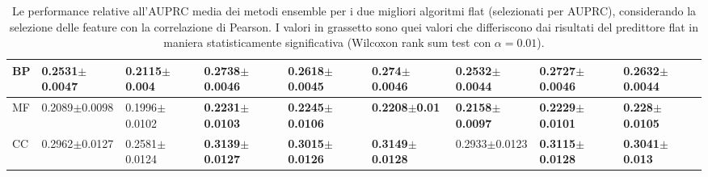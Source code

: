 \documentclass[12pt]{report}
\begin{document}
\begin{table}[h!]
{\begin{subtable}[t]{0.4\textwidth}
\begin{tabular}{|l|l|l|l|l|l|l|l|l|}
BP&\footnotesize{0.2531$\pm$0.0047}&\footnotesize{0.2115$\pm$0.004}& \textbf{\footnotesize{0.2738$\pm$0.0046}} & \textbf{\footnotesize{0.2618$\pm$0.0045}} & \textbf{\footnotesize{0.274$\pm$0.0046}} &\footnotesize{0.2532$\pm$0.0044}& \textbf{\footnotesize{0.2727$\pm$0.0046}} & \textbf{\footnotesize{0.2632$\pm$0.0044}} \\ \hline
MF&\footnotesize{0.2089$\pm$0.0098}&\footnotesize{0.1996$\pm$0.0102}& \textbf{\footnotesize{0.2231$\pm$0.0103}} & \textbf{\footnotesize{0.2245$\pm$0.0106}} & \textbf{\footnotesize{0.2208$\pm$0.01}} & \textbf{\footnotesize{0.2158$\pm$0.0097}} & \textbf{\footnotesize{0.2229$\pm$0.0101}} & \textbf{\footnotesize{0.228$\pm$0.0105}} \\ \hline
CC&\footnotesize{0.2962$\pm$0.0127}&\footnotesize{0.2581$\pm$0.0124}& \textbf{\footnotesize{0.3139$\pm$0.0127}} & \textbf{\footnotesize{0.3015$\pm$0.0126}} & \textbf{\footnotesize{0.3149$\pm$0.0128}} &\footnotesize{0.2933$\pm$0.0123}& \textbf{\footnotesize{0.3115$\pm$0.0128}} & \textbf{\footnotesize{0.3041$\pm$0.013}} \\ \hline\end{tabular}
                    \label{table1}
                    \end{subtable}}
\caption{\footnotesize{Le performance relative all'AUPRC media dei metodi ensemble per i due migliori algoritmi flat (selezionati per AUPRC), considerando la selezione delle feature con la correlazione di Pearson. I valori in grassetto sono quei valori che differiscono dai risultati del predittore flat in maniera statisticamente significativa (Wilcoxon rank sum test con $\alpha = 0.01$).}}
\label{best_auprc_fs}
\end{table}
\newpage
\end{document}
